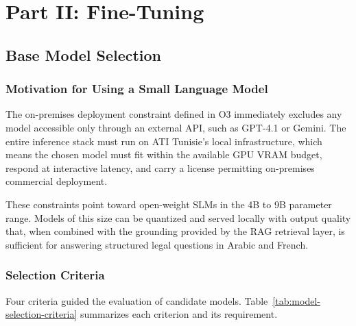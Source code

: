 
\section{Part II: Fine-Tuning}
\label{sec:part2-finetuning}

\subsection{Base Model Selection}
\label{sec:base-model-selection}

\subsubsection{Motivation for Using a Small Language Model}

The on-premises deployment constraint defined in O3 immediately excludes any model accessible only through an external \ac{API}, such as GPT-4.1 or Gemini. The entire inference stack must run on \ac{ATI} Tunisie's local infrastructure, which means the chosen model must fit within the available \ac{GPU} \ac{VRAM} budget, respond at interactive latency, and carry a license permitting on-premises commercial deployment.

\vspace{1em}

These constraints point toward open-weight \acp{SLM} in the 4B to 9B parameter range. Models of this size can be quantized and served locally with output quality that, when combined with the grounding provided by the \ac{RAG} retrieval layer, is sufficient for answering structured legal questions in Arabic and French.

\subsubsection{Selection Criteria}

Four criteria guided the evaluation of candidate models. Table~\ref{tab:model-selection-criteria} summarizes each criterion and its requirement.

